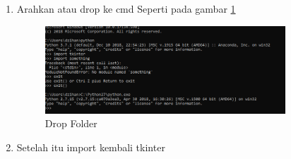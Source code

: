 \begin{enumerate}
\item Arahkan atau drop ke cmd
Seperti pada gambar \ref{fig:dropfolder}
\begin{figure}[!htbp]
	\centerline{\includegraphics[width=0.85\textwidth]{figures/3/dropfolder.PNG}}
	\caption{Drop Folder}
	\label{fig:dropfolder}
\end{figure}

\item Setelah itu import kembali tkinter
\end{enumerate}

